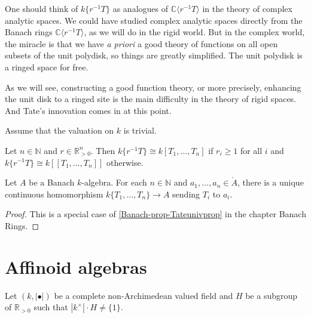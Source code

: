 \begin{remark}
One should think of $k\{r^{-1}T\}$ as analogues of $\mathbb{C}\langle r^{-1}T\rangle$ in the theory of complex analytic spaces.  We could have studied complex analytic spaces directly from the Banach rings $\mathbb{C}\langle r^{-1}T\rangle$, as we will do in the rigid world. But in the complex world, the miracle is that we have \emph{a priori} a good theory of functions on all open subsets of the unit polydisk, so things are greatly simplified. The unit polydisk is a ringed space for free.

As we will see, constructing a good function theory, or more precisely, enhancing the unit disk to a ringed site is the main difficulty in the theory of rigid spaces. And Tate's innovation comes in at this point.
\end{remark}

\begin{example}\label{ex-trivvaluedaff}
    Assume that the valuation on $k$ is trivial. 

    Let $n\in \mathbb{N}$ and $r\in \mathbb{R}^n_{>0}$. 
    Then $k\{r^{-1}T\}\cong k[T_1,\ldots,T_n]$ if $r_i\geq 1$ for all $i$ and $k\{r^{-1}T\}\cong k[[T_1,\ldots,T_n]]$ otherwise.
\end{example}

\begin{lemma}\label{lma-Tatestrictuniv}
    Let $A$ be a Banach $k$-algebra. For each $n\in \mathbb{N}$ and $a_1,\ldots,a_n\in \mathring{A}$, there is a unique continuous homomorphism $k\{T_1,\ldots,T_n\}\rightarrow A$ sending $T_i$ to $a_i$.
\end{lemma}
\begin{proof}
    This is a special case of \cref{Banach-prop-Tateunivprop} in the chapter Banach Rings.
\end{proof}





\section{Affinoid algebras}
Let $(k,|\bullet|)$ be a complete non-Archimedean valued field and $H$ be a subgroup of $\mathbb{R}_{>0}$ such that $|k^{\times}|\cdot H\neq \{1\}$.
 
